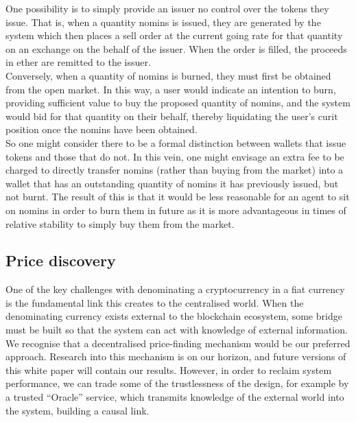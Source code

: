 One possibility is to simply provide an issuer no control over the tokens they issue. That is, when a quantity nomins is issued, they are generated by the system which then places a sell order at the current going rate for that quantity on an exchange on the behalf of the issuer. When the order is filled, the proceeds in ether are remitted to the issuer. \\

\noindent Conversely, when a quantity of nomins is burned, they must first be obtained from the open market. In this way, a user would indicate an intention to burn, providing sufficient value to buy the proposed quantity of nomins, and the system would bid for that quantity on their behalf, thereby liquidating the user's curit position once the nomins have been obtained. \\

\noindent So one might consider there to be a formal distinction between wallets that issue tokens and those that do not. In this vein, one might envisage an extra fee to be charged to directly transfer nomins (rather than buying from the market) into a wallet that has an outstanding quantity of nomins it has previously issued, but not burnt. The result of this is that it would be less reasonable for an agent to sit on nomins in order to burn them in future as it is more advantageous in times of relative stability to simply buy them from the market. \\

\pagebreak 

\subsection{Price discovery}

One of the key challenges with denominating a cryptocurrency in a fiat currency is the
fundamental link this creates to the centralised world. When the denominating currency exists
external to the blockchain ecosystem, some bridge must be built so that the system can act with
knowledge of external information.
We recognise that a decentralised price-finding mechanism would be our preferred approach.
Research into this mechanism is on our horizon, and future versions of this white paper will contain
our results.
However, in order to reclaim system performance, we can trade some of the trustlessness of the design, for example by
a trusted ``Oracle'' service, which transmits knowledge of the external world into the system, building a causal link.


